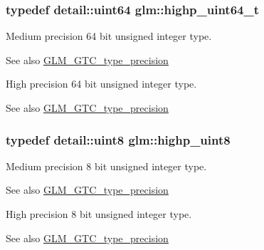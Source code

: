\subsubsection[{highp\+\_\+uint64\+\_\+t}]{\setlength{\rightskip}{0pt plus 5cm}typedef detail\+::uint64 {\bf glm\+::highp\+\_\+uint64\+\_\+t}}\label{group__gtc__type__precision_ga6e66f40c5909bfc872b068187fa6029e}
Medium precision 64 bit unsigned integer type. \begin{DoxySeeAlso}{See also}
\hyperlink{group__gtc__type__precision}{G\+L\+M\+\_\+\+G\+T\+C\+\_\+type\+\_\+precision}
\end{DoxySeeAlso}
High precision 64 bit unsigned integer type. \begin{DoxySeeAlso}{See also}
\hyperlink{group__gtc__type__precision}{G\+L\+M\+\_\+\+G\+T\+C\+\_\+type\+\_\+precision} 
\end{DoxySeeAlso}
\hypertarget{group__gtc__type__precision_ga2c27c6dd26e893786f04b10f99c1ee95}{}
\subsubsection[{highp\+\_\+uint8}]{\setlength{\rightskip}{0pt plus 5cm}typedef {\bf detail\+::uint8} {\bf glm\+::highp\+\_\+uint8}}\label{group__gtc__type__precision_ga2c27c6dd26e893786f04b10f99c1ee95}
Medium precision 8 bit unsigned integer type. \begin{DoxySeeAlso}{See also}
\hyperlink{group__gtc__type__precision}{G\+L\+M\+\_\+\+G\+T\+C\+\_\+type\+\_\+precision}
\end{DoxySeeAlso}
High precision 8 bit unsigned integer type. \begin{DoxySeeAlso}{See also}
\hyperlink{group__gtc__type__precision}{G\+L\+M\+\_\+\+G\+T\+C\+\_\+type\+\_\+precision} 
\end{DoxySeeAlso}
\hypertarget{group__gtc__type__precision_ga9ba529fcc75b82d23da979f0ce6e4518}{}
